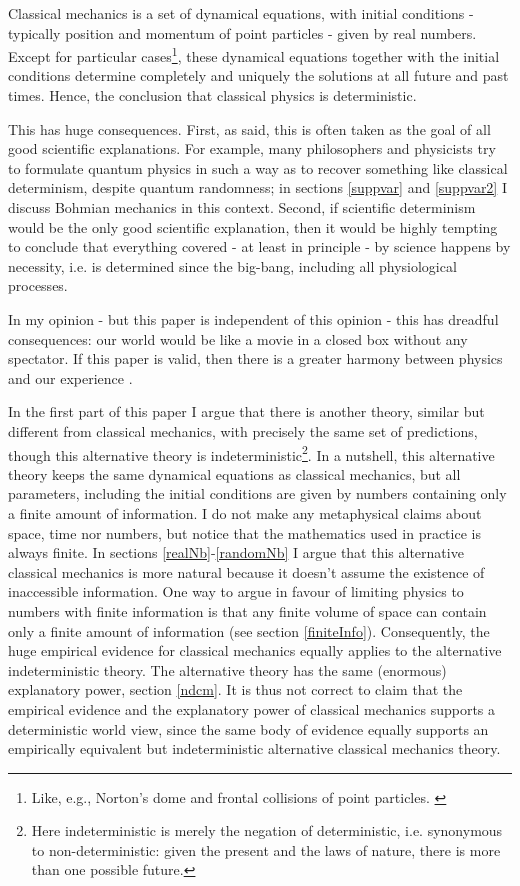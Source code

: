 \documentclass[pra,aps,groupedaddress,twocolumn,floatfix,nofootinbib]{revtex4}
\begin{document}
Classical mechanics is a set of dynamical equations, with initial conditions - typically position and momentum of point particles - given by real numbers. Except for particular cases\footnote{Like, e.g., Norton's dome \cite{NortonDome} and frontal collisions of point particles. \label{FN1}}, these dynamical equations together with the initial conditions determine completely and uniquely the solutions at all future and past times. Hence, the conclusion that classical physics is deterministic.

This has huge consequences. First, as said, this is often taken as the goal of all good scientific explanations. For example, many philosophers and physicists try to formulate quantum physics in such a way as to recover something like classical determinism, despite quantum randomness; in sections \ref{suppvar} and \ref{suppvar2} I discuss Bohmian mechanics in this context. Second, if scientific determinism would be the only good scientific explanation, then it would be highly tempting to conclude that everything covered - at least in principle - by science happens by necessity, i.e. is determined since the big-bang, including all physiological processes.

In my opinion - but this paper is independent of this opinion - this has dreadful consequences: 
our world would be like a movie in a closed box without any spectator. 
If this paper is valid, then there is a greater harmony between physics and our experience \cite{DolevHarmony}.

In the first part of this paper I argue that there is another theory, similar but different from classical mechanics, with precisely the same set of predictions, though this alternative theory is indeterministic\footnote{Here indeterministic is merely the negation of deterministic, i.e. synonymous to non-deterministic: given the present and the laws of nature, there is more than one possible future.}. In a nutshell, this alternative theory keeps the same dynamical equations as classical mechanics, but all parameters, including the initial conditions are given by numbers containing only a finite amount of information. I do not make any metaphysical claims about space, time nor numbers, but notice that the mathematics used in practice is always finite. In sections \ref{realNb}-\ref{randomNb} I argue that this alternative classical mechanics is more natural because it doesn't assume the existence of inaccessible information. One way to argue in favour of limiting physics to numbers with finite information is that any finite volume of space can contain only a finite amount of information (see section \ref{finiteInfo}). Consequently, the huge empirical evidence for classical mechanics equally applies to the alternative indeterministic theory. The alternative theory has the same (enormous) explanatory power, section \ref{ndcm}. It is thus not correct to claim that the empirical evidence and the explanatory power of classical mechanics supports a deterministic world view, since the same body of evidence equally supports an empirically equivalent but indeterministic alternative classical mechanics theory.
\end{document}

